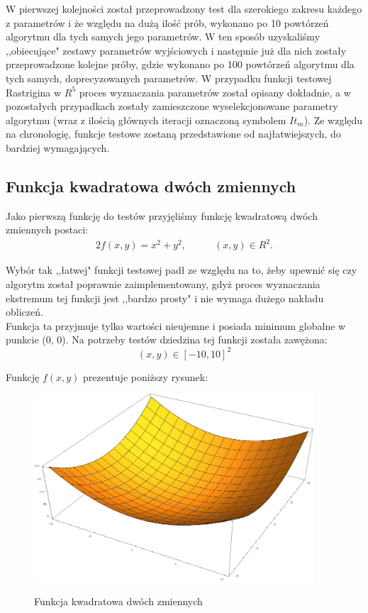 \documentclass[twoside]{projektInzynierskiMS1}
\newcommand{\si}{ś}
\begin{document}
W pierwszej kolejno\si ci został przeprowadzony test dla szerokiego zakresu każdego z parametrów i że względu na dużą ilo\si ć prób, wykonano po 10 powtórzeń algorytmu dla tych samych jego parametrów. W ten sposób uzyskali\si my ,,obiecujące" zestawy parametrów wyj\si ciowych i następnie już dla nich zostały przeprowadzone kolejne próby, gdzie wykonano po 100 powtórzeń algorytmu dla tych samych, doprecyzowanych parametrów. W przypadku funkcji testowej Rastrigina w $R^5$ proces wyznaczania parametrów został opisany dokładnie, a w pozostałych przypadkach zostały zamieszczone wyselekcjonowane parametry algorytmu (wraz z ilo\si cią głównych iteracji oznaczoną symbolem $It_m$). Ze względu na chronologię, funkcje testowe zostaną przedstawione od najłatwiejszych, do bardziej wymagających.



	\subsection{Funkcja kwadratowa dwóch zmiennych}
	Jako pierwszą funkcję do testów przyjęli\si my funkcję kwadratową dwóch zmiennych postaci:
\begin{alignat*}{2}
f(x, y) = x^2 + y^2,&\qquad  (x, y) \in R^2.
\end{alignat*}

Wybór tak ,,łatwej" funkcji testowej padł ze względu na to, żeby upewnić się czy algorytm został poprawnie zaimplementowany, gdyż proces wyznaczania ekstremum tej funkcji jest ,,bardzo prosty" i nie wymaga dużego nakładu obliczeń. \\

Funkcja ta przyjmuje tylko warto\si ci nieujemne i posiada minimum globalne w punkcie (0, 0). Na potrzeby testów dziedzina tej funkcji została zawężona:
\[(x, y)  \in [-10,10]^2 \]

Funkcję $f(x, y)$ prezentuje poniższy rysunek:\\
\begin{figure}[H]
	\begin{center}
		\includegraphics[height=7cm]{pics/quadraticFunction1.png}\\
	\end{center}
	\caption{Funkcja kwadratowa dwóch zmiennych}
\end{figure}
\end{document}
